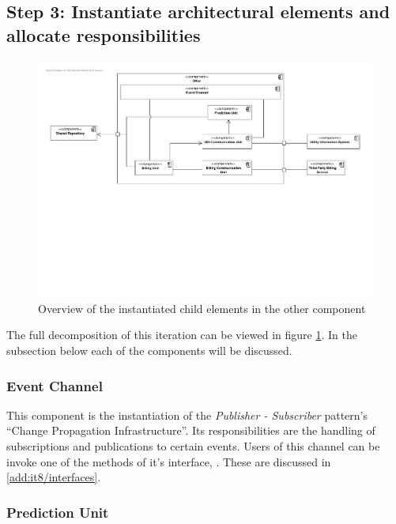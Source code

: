 \subsection{Step 3: Instantiate architectural elements and allocate responsibilities}
\label{add:it10/elements}

\begin{figure}[H]
	\begin{centering}
		\includegraphics[width=\textwidth]{figs/add-it10-elements.pdf}
		\caption{Overview of the instantiated child elements in the other component}
		\label{fig:add/it10/decomposition}
	\end{centering}
\end{figure}

\npar The full decomposition of this iteration can be viewed in figure
\ref{fig:add/it10/decomposition}. In the subsection below each of the components
will be discussed. 

\subsubsection{Event Channel}

\npar This component is the instantiation of the \emph{Publisher - Subscriber}
pattern's ``Change Propagation Infrastructure''. Its responsibilities are the
handling of subscriptions and publications to certain events. Users of this
channel can be invoke one of the methods of it's interface,
. These are discussed in \ref{add:it8/interfaces}.

\subsubsection{Prediction Unit}

